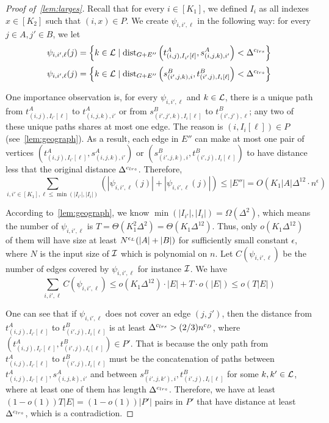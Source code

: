 \begin{proof}[Proof of~\cref{lem:larges}]
	Recall that for every $i\in[K_1]$, we defined $I_{i}$ as all indexes $x\in[K_2]$ such that $(i,x)\in P$. We create \mlab{} $\psi_{i,i',\ell}$ in the following way: for every $j\in A,j'\in B$, we let 
	\[\psi_{i,i',\ell}(j)=\left\{k\in\mathcal{L}\mid\text{dist}_{G+E''}\left(t^A_{(i,j),I_{i'}[\ell]},s^A_{(i,j,k),i'}\right)<\Delta^{{c_{lrs}}{}}\right\}\]
	\[\psi_{i,i',\ell}(j)=\left\{k\in\mathcal{L}\mid\text{dist}_{G+E''}\left(s^B_{(i',j,k),i},t^B_{(i',j),I_{i}[\ell]}\right)<\Delta^{{c_{lrs}}{}}\right\}\]
	
	One importance observation is, for every $\psi_{i,i',\ell}$ and $k\in\mathcal{L}$, there is a unique path from $t^A_{(i,j),I_{i'}[\ell]}$ to $t^A_{(i,j,k),i'}$ or from $s^B_{(i',j',k),I_i[\ell]}$ to $t^B_{(i',j'),\ell}$; any two of these unique paths shares at most one edge. The reason is $(i,I_i[\ell])\in P$ (see~\cref{lem:geograph}). As a result, each edge in $E''$ can make at most one pair of vertices $(t^A_{(i,j),I_{i'}[\ell]},s^A_{(i,j,k),i'})$ or $(s^B_{(i',j,k),i},t^B_{(i',j),I_{i}[\ell]})$ to have distance less that the original distance $\Delta^{{c_{lrs}}{}}$. Therefore,
	\[\sum_{i,i'\in[K_1],\ell\le \min(|I_{i'}|,|I_{i}|)}\left(|\psi_{i,i',\ell}(j)|+|\psi_{i,i',\ell}(j)|\right)\le |E''|=O(K_1|A|\Delta^{12}\cdot n^\epsilon)\]
	
	According to~\cref{lem:geograph}, we know $\min(|I_{i'}|,|I_{i}|)=\Omega(\Delta^2)$, which means the number of \mlab{} $\psi_{i,i',\ell}$ is $T=\Theta(K_1^2\Delta^2)=\Theta(K_1\Delta^{12})$. Thus, only $o(K_1\Delta^{12})$ of them will have size at least $N^{\epsilon_{L}{}}(|A|+|B|)$ for sufficiently small constant $\epsilon$, where $N$ is the input size of $\mathcal{I}$ which is polynomial on $n$. Let $C(\psi_{i,i',\ell})$ be the number of edges covered by $\psi_{i,i',\ell}$ for instance $\mathcal{I}$. We have 
	\[\sum_{i,i',\ell}C(\psi_{i,i',\ell})\le o(K_1\Delta^{12})\cdot |E|+T\cdot o(|E|)\le o(T|E|)\]
	
	One can see that if $\psi_{i,i',\ell}$ does not cover an edge $(j,j')$, then the distance from $t^A_{(i,j),I_{i'}[\ell]}$ to $t^B_{(i',j),I_{i}[\ell]}$ is at least $\Delta^{{c_{lrs}}{}}>(2/3)n^{c_D}$, where $(t^A_{(i,j),I_{i'}[\ell]},t^B_{(i',j),I_{i}[\ell]})\in P'$. That is because the only path from $t^A_{(i,j),I_{i'}[\ell]}$ to $t^B_{(i',j),I_{i}[\ell]}$ must be the concatenation of paths between $t^A_{(i,j),I_{i'}[\ell]},s^A_{(i,j,k),i'}$ and between $s^B_{(i',j,k'),i},t^B_{(i',j),I_{i}[\ell]}$ for some $k,k'\in\mathcal{L}$, where at least one of them has length $\Delta^{{c_{lrs}}{}}$. Therefore, we have at least $(1-o(1))T|E|=(1-o(1))|P'|$ pairs in $P'$ that have distance at least $\Delta^{{c_{lrs}}{}}$, which is a contradiction.%
	
\end{proof}
